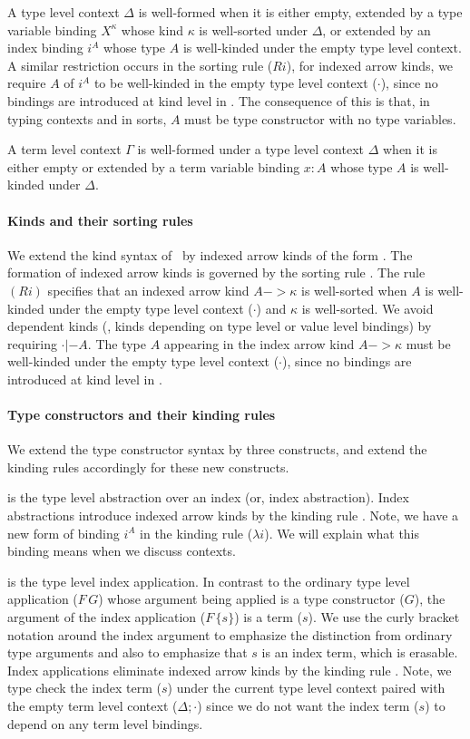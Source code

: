 A type level context $\Delta$ is well-formed when it is either empty,
extended by a type variable binding $X^\kappa$ whose kind $\kappa$ is
well-sorted under $\Delta$, or extended by an index binding $i^A$
whose type $A$ is well-kinded under the empty type level context.
A similar restriction occurs in the sorting rule ($Ri$), for indexed arrow kinds,
we require $A$ of $i^A$ to be well-kinded in the empty type level context
($\cdot$), since no bindings are introduced at kind level in \Fi. The consequence of
this is that, in typing contexts and in sorts, $A$ must be type constructor with no
type variables.

A term level context $\Gamma$ is well-formed under a type level context
$\Delta$ when it is either empty or extended by a term variable binding
$x:A$ whose type $A$ is well-kinded under $\Delta$.


\paragraph{Kinds and their sorting rules}
We extend the kind syntax of \Fw\ by indexed arrow kinds of the form
. The formation of indexed arrow kinds is
governed by the sorting rule . The rule $(Ri)$ specifies that
an indexed arrow kind $A -> \kappa$ is well-sorted when $A$ is well-kinded
under the empty type level context ($\cdot$) and $\kappa$ is well-sorted.
We avoid dependent kinds (\ie, kinds depending on type level or value level
bindings) by requiring $\cdot |- A$. The type $A$ appearing in
the index arrow kind $A -> \kappa$ must be well-kinded under
the empty type level context ($\cdot$), since no bindings are
introduced at kind level in \Fi.

\paragraph{Type constructors and their kinding rules}
We extend the type constructor syntax by three constructs,
and extend the kinding rules accordingly for these new constructs.

 is the type level abstraction over an index
(or, index abstraction). Index abstractions introduce indexed arrow kinds
by the kinding rule . Note, we have a new form of binding
$i^A$ in the kinding rule ($\lambda i$).
We will explain what this binding means when we discuss contexts.

 is the type level index application. In contrast to
the ordinary type level application ($F\,G$) whose argument being applied is
a type constructor ($G$), the argument of the index application ($F\,\{s\}$) is
a term ($s$). We use the curly bracket notation around the index argument to
emphasize the distinction from ordinary type arguments and also to emphasize
that $s$ is an index term, which is erasable. Index applications eliminate
indexed arrow kinds by the kinding rule . Note, we type check
the index term ($s$) under the current type level context paired with
the empty term level context ($\Delta;\cdot$) since we do not want
the index term ($s$) to depend on any term level bindings.

